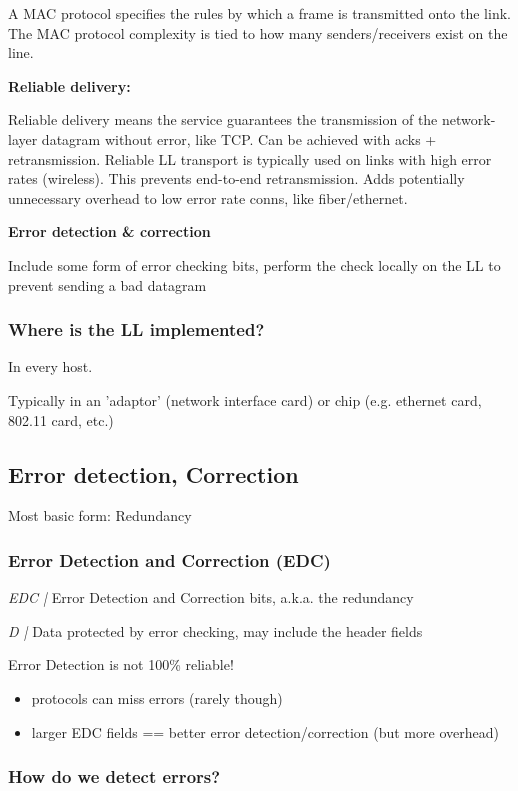 \documentclass{article}
\newcommand{\topic}[1]{\noindent\textbf{#1}}
\newcommand{\define}[1]{\noindent\textit{#1 |}}
\begin{document}
A MAC protocol specifies the rules by which a frame is transmitted onto the link. The MAC protocol complexity is tied to how many senders/receivers exist on the line.

\topic{Reliable delivery:}

Reliable delivery means the service guarantees the transmission of the network-layer datagram without error, like TCP. Can be achieved with acks + retransmission. Reliable LL transport is typically used on links with high error rates (wireless). This prevents end-to-end retransmission. Adds potentially unnecessary overhead to low error rate conns, like fiber/ethernet.

\topic{Error detection \& correction}

Include some form of error checking bits, perform the check locally on the LL to prevent sending a bad datagram

\subsubsection*{Where is the LL implemented?}

In every host.

Typically in an 'adaptor' (network interface card) or chip (e.g. ethernet card, 802.11 card, etc.)

\subsection{Error detection, Correction}

Most basic form: Redundancy

\subsubsection*{Error Detection and Correction (EDC)}

\define{EDC} Error Detection and Correction bits, a.k.a. the redundancy

\define{D} Data protected by error checking, may include the header fields

Error Detection is not 100\% reliable!
\begin{itemize}[noitemsep,nolistsep]
	\item protocols can miss errors (rarely though)
	\item larger EDC fields == better error detection/correction (but more overhead)
\end{itemize}

\subsubsection*{How do we detect errors?}
\end{document}
